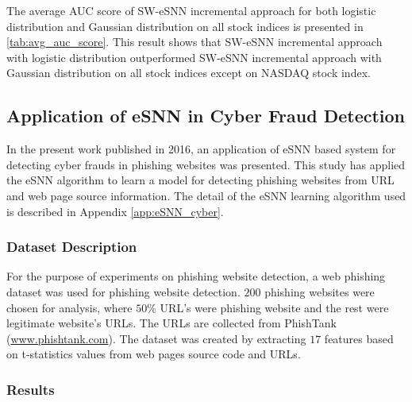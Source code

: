 The average AUC score of SW-eSNN incremental approach for both logistic distribution and Gaussian distribution on all stock indices is presented in \tablename \ref{tab:avg_auc_score}. This result shows that SW-eSNN incremental approach with logistic distribution outperformed SW-eSNN incremental approach with Gaussian distribution on all stock indices except on NASDAQ stock index.

\subsection{Application of eSNN in Cyber Fraud Detection}

In the present work \citep{arya2016cyber} published in 2016, an application of eSNN based system for detecting cyber frauds in phishing websites was presented. This study has applied the eSNN algorithm to learn a model for detecting phishing websites from URL and web page source information. The detail of the eSNN learning algorithm used is described in Appendix \ref{app:eSNN_cyber}.

\subsubsection{Dataset Description}
For the purpose of experiments on phishing website detection, a web phishing dataset was used for phishing website detection. $200$ phishing websites were chosen for analysis, where $50\%$ URL's were phishing website and the rest were legitimate website’s URLs. The URLs are collected from PhishTank (\url{www.phishtank.com}). The dataset was created by extracting $17$ features based on t-statistics values from web pages source code and URLs.

\subsubsection{Results}

\begin{table}
	\centering
	\caption{Comparison of performance of eSNN and other iterative and non iterative machine learning algorithms on the phishing website data.}
	\label{tab:phising1}
\end{table}

